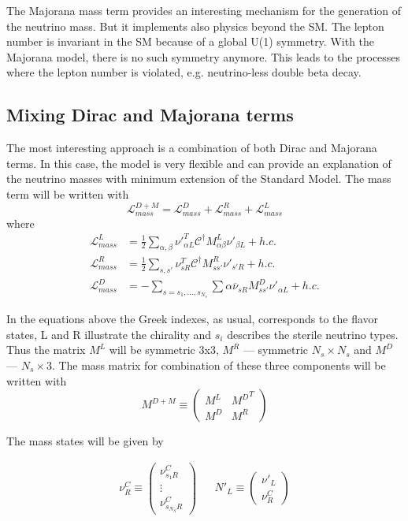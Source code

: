 \documentclass[../main.tex]{subfiles}
\begin{document}
The Majorana mass term provides an interesting mechanism for the generation of the neutrino mass. But it implements also physics beyond the SM. The lepton number is invariant in the SM because of a global U(1) symmetry. With the Majorana model, there is no such symmetry anymore. This leads to the processes where the lepton number is violated, e.g. neutrino-less double beta decay.


\subsection{Mixing Dirac and Majorana terms}
The most interesting approach is a combination of both Dirac and Majorana terms. In this case, the model is very flexible and can provide an explanation of the neutrino masses with minimum extension of the Standard Model. The mass term will be written with
\begin{equation}
\label{eq:intro:comb}
\mathcal{L}_{mass}^{D+M}=\mathcal{L}^D_{mass}+\mathcal{L}^R_{mass}+\mathcal{L}^L_{mass}
\end{equation}
where
\begin{align}
\mathcal{L}^L_{mass}&=\frac{1}{2}\sum_{\alpha,\beta}\nu'^T_{\alpha L}\mathcal{C}^\dagger M^L_{\alpha\beta}\nu'_{\beta L}+h.c. \\
\mathcal{L}^R_{mass}&=\frac{1}{2}\sum_{s, s'}\nu^T_{s R}\mathcal{C}^\dagger M^R_{ss'}\nu'_{s' R}+h.c. \\
\mathcal{L}^D_{mass}&=-\sum_{s=s_1, ..., s_{N_s}}\sum{\alpha}\overline{\nu}_{sR}M^D_{ss'}\nu'_{\alpha L} +h.c.
\end{align}

In the equations above the Greek indexes, as usual, corresponds to the flavor states, L and R illustrate the chirality and $s_i$ describes the sterile neutrino types. Thus the matrix $M^L$ will be symmetric 3x3, $M^R$ --- symmetric $N_s\times N_s$ and $M^D$ --- $N_s\times3$. The mass matrix for combination of these three components will be written with
\begin{equation}
M^{D+M}\equiv
\begin{pmatrix}
M^L & {M^D}^T \\
M^D & M^R
\end{pmatrix}
\end{equation}

The mass states will be given by

\begin{align}
\nu_R^C\equiv
\begin{pmatrix}
\nu^C_{s_1R} \\
\vdots \\
\nu^C_{s_{N_S}R}
\end{pmatrix}
&&
N'_L\equiv
\begin{pmatrix}
\nu'_L \\ \nu^C_R
\end{pmatrix}
\end{align}
\end{document}
